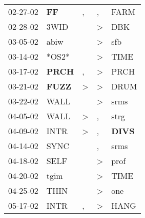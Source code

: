 \begin{supertabular}{p{0.07\textwidth}p{0.06\textwidth}p{0.02\textwidth}p{0.02\textwidth}p{0.06\textwidth}}
          02-27-02\textsuperscript{} &    \textbf{FF\textsuperscript{}} &                , &                , &           FARM\textsuperscript{} \\
          02-28-02\textsuperscript{} &           3WID\textsuperscript{} &                  &     \textgreater &            DBK\textsuperscript{} \\
          03-05-02\textsuperscript{} &           abiw\textsuperscript{} &                  &     \textgreater &            sfb\textsuperscript{} \\
          03-14-02\textsuperscript{} &                            *OS2* &                  &     \textgreater &           TIME\textsuperscript{} \\
          03-17-02\textsuperscript{} &  \textbf{PRCH\textsuperscript{}} &                , &     \textgreater &           PRCH\textsuperscript{} \\
          03-21-02\textsuperscript{} &  \textbf{FUZZ\textsuperscript{}} &     \textgreater &     \textgreater &           DRUM\textsuperscript{} \\
          03-22-02\textsuperscript{} &           WALL\textsuperscript{} &                  &     \textgreater &           srms\textsuperscript{} \\
          04-05-02\textsuperscript{} &           WALL\textsuperscript{} &     \textgreater &                , &           strg\textsuperscript{} \\
          04-09-02\textsuperscript{} &           INTR\textsuperscript{} &     \textgreater &                , &  \textbf{DIVS\textsuperscript{}} \\
          04-14-02\textsuperscript{} &           SYNC\textsuperscript{} &                  &                , &           srms\textsuperscript{} \\
          04-18-02\textsuperscript{} &           SELF\textsuperscript{} &                  &     \textgreater &           prof\textsuperscript{} \\
          04-20-02\textsuperscript{} &           tgim\textsuperscript{} &                  &     \textgreater &           TIME\textsuperscript{} \\
          04-25-02\textsuperscript{} &           THIN\textsuperscript{} &                  &     \textgreater &            one\textsuperscript{} \\
          05-17-02\textsuperscript{} &           INTR\textsuperscript{} &                , &     \textgreater &           HANG\textsuperscript{} \\

\end{supertabular}
